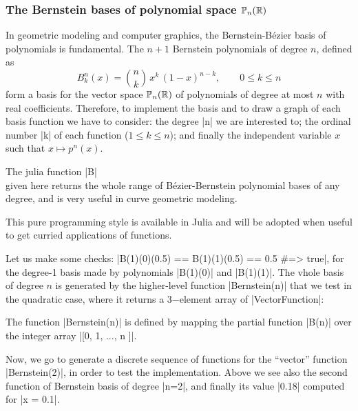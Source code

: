 \subsubsection*{The Bernstein bases of polynomial space $\mathbb{P}_n(\mathbb{R})$}

In geometric modeling and computer graphics, the Bernstein-Bézier basis of polynomials is fundamental. The $n+1$ Bernstein polynomials of degree $n$, defined as
\[
B^n_k(x) = {n \choose k}\,x^k\,(1-x)^{n-k}, \qquad 0\leq k \leq n
\]
form a basis for the vector space $\mathbb{P}_{n}(\mathbb{R})$ of polynomials of degree at most $n$ with real coefficients. Therefore, to implement the basis and to draw a graph of each basis function we have to consider: the degree |n| we are interested to; the ordinal number |k| of each function ($1\leq k\leq n$); and finally the independent variable $x$ such that $x \mapsto p^n(x)$. 

\begin{coding}
The julia function |B| \\ given here returns the whole range of Bézier-Bernstein polynomial bases of any degree, and is very useful in curve geometric modeling.

This pure programming style is available in Julia and will be adopted when useful to get curried applications of functions. 
\end{coding}


Let us make some checks: |B(1)(0)(0.5) == B(1)(1)(0.5) == 0.5 #=> true|,  for the degree-1 basis  made by polynomials |B(1)(0)| and |B(1)(1)|.  The vhole basis of degree $n$ is generated by the higher-level function |Bernstein(n)| that we test in the quadratic case, where it returns a 3−element array of |Vector{Function}|:
\begin{coding}
The function |Bernstein(n)| is defined by mapping the partial function |B(n)| over the integer array |[0, 1, ..., n ]|. 

\end{coding}


Now, we go to generate a discrete sequence of functions for the “vector” function |Bernstein(2)|, in order to test the implementation. 
Above we see also the second function of Bernstein basis of degree |n=2|, and finally its value |0.18| computed for |x = 0.1|. 

